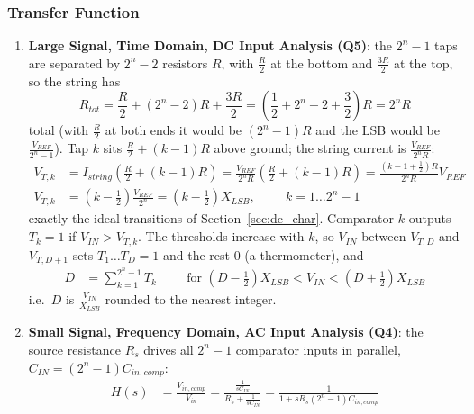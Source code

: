 \subsubsection{Transfer Function}
\begin{enumerate}
  \item \textbf{Large Signal, Time Domain, DC Input Analysis (Q5)}: the
\(2^n - 1\) taps are separated by \(2^n - 2\) resistors \(R\), with
\(\frac{R}{2}\) at the bottom and \(\frac{3R}{2}\) at the top, so the string
has
\[
  R_{tot} = \frac{R}{2} + (2^n - 2) R + \frac{3R}{2} = \left(\frac{1}{2} + 2^n - 2 + \frac{3}{2}\right) R = 2^n R
\]
total (with \(\frac{R}{2}\) at both ends it would be \((2^n - 1) R\) and the
LSB would be \(\frac{V_{REF}}{2^n - 1}\)). Tap \(k\) sits
\(\frac{R}{2} + (k - 1) R\) above ground; the string current is
\(\frac{V_{REF}}{2^n R}\):
\begin{align*}
  V_{T,k} &= I_{string}\left(\frac{R}{2} + (k - 1) R\right) = \frac{V_{REF}}{2^n R}\left(\frac{R}{2} + (k - 1) R\right) = \frac{\left(k - 1 + \frac{1}{2}\right) R}{2^n R} V_{REF} \\
  V_{T,k} &= \left(k - \frac{1}{2}\right) \frac{V_{REF}}{2^n} = \left(k - \frac{1}{2}\right) X_{LSB}, \hspace{1cm} k = 1 \ldots 2^n - 1
\end{align*}
exactly the ideal transitions of Section~\ref{sec:dc_char}. Comparator \(k\)
outputs \(T_k = 1\) if \(V_{IN} > V_{T,k}\). The thresholds increase with \(k\), so
\(V_{IN}\) between \(V_{T,D}\) and \(V_{T,D+1}\) sets \(T_1 \ldots T_D = 1\) and the rest 0
(a thermometer), and
\begin{align*}
  D &= \sum_{k=1}^{2^n - 1} T_k \hspace{1cm} \text{for } \left(D - \tfrac{1}{2}\right) X_{LSB} < V_{IN} < \left(D + \tfrac{1}{2}\right) X_{LSB}
\end{align*}
i.e.\ \(D\) is \(\frac{V_{IN}}{X_{LSB}}\) rounded to the nearest integer.
  \item \textbf{Small Signal, Frequency Domain, AC Input Analysis (Q4)}: the source resistance \(R_s\)
    drives all \(2^n - 1\) comparator inputs in parallel, \(C_{IN} = (2^n - 1) C_{in,comp}\):
    \begin{align*}
      H(s) &= \frac{V_{in,comp}}{V_{in}} = \frac{\frac{1}{sC_{IN}}}{R_s + \frac{1}{sC_{IN}}} = \frac{1}{1 + s R_s (2^n - 1) C_{in,comp}} \tag{1}
    \end{align*}
\end{enumerate}

